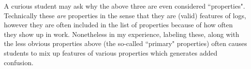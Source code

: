 \documentclass{ximeraXloud}
\begin{document}
    A curious student may ask why the above three are even considered ``properties". Technically these \textit{are} properties in the sense that they are (valid) features of logs, however they are often included in the list of properties because of how often they show up in work. Nonetheless in my experience, labeling these, along with the less obvious properties above (the so-called ``primary" properties) often causes students to mix up features of various properties which generates added confusion.
%
%
%
%
\end{document}
